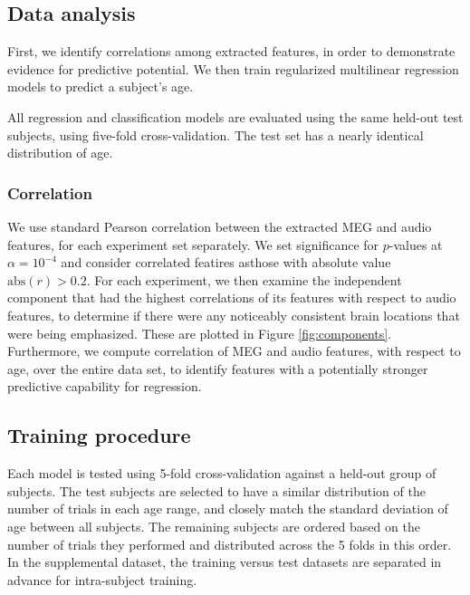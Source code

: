 \documentclass[utf8]{frontiersSCNS} %
\begin{document}
\subsection{Data analysis}

First, we identify correlations among extracted features, in order to demonstrate evidence for predictive potential. We then train regularized multilinear regression models to predict a subject's age.

All regression and classification models are evaluated using the same held-out test subjects, using five-fold cross-validation. The test set has a nearly identical distribution of age.

\subsubsection{Correlation}

We use standard Pearson correlation between the extracted MEG and audio features, for each experiment set separately. We set significance for $p$-values at $\alpha = 10^{-4}$ and consider correlated featires asthose with absolute value $\text{abs}(r) > 0.2$. For each experiment, we then examine the independent component that had the highest correlations of its features with respect to audio features, to determine if there were any noticeably consistent brain locations that were being emphasized. These are plotted in Figure \ref{fig:components}. Furthermore, we compute correlation of MEG and audio features, with respect to age, over the entire data set, to identify features with a potentially stronger predictive capability for regression.

\subsection{Training procedure} \label{sec:train_proc}

Each model is tested using 5-fold cross-validation against a held-out group of subjects. The test subjects are selected to have a similar distribution of the number of trials in each age range, and closely match the standard deviation of age between all subjects. The remaining subjects are ordered based on the number of trials they performed and distributed across the 5 folds in this order. In the supplemental dataset, the training versus test datasets are separated in advance for intra-subject training.
\end{document}
